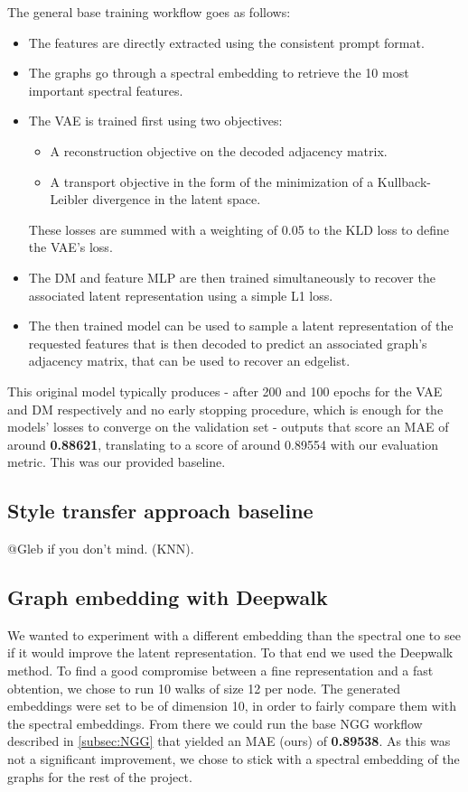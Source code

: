 \documentclass[10pt,twocolumn,letterpaper]{article}
\begin{document}
The general base training workflow goes as follows:
\begin{itemize}
    \item The features are directly extracted using the consistent prompt format.
    \item The graphs go through a spectral embedding to retrieve the 10 most important spectral features.
    \item The VAE is trained first using two objectives:
    \begin{itemize}
        \item A reconstruction objective on the decoded adjacency matrix.
        \item A transport objective in the form of the minimization of a Kullback-Leibler divergence in the latent space.
    \end{itemize}
    These losses are summed with a weighting of 0.05 to the KLD loss to define the VAE's loss.
    \item The DM and feature MLP are then trained simultaneously to recover the associated latent representation using a simple L1 loss.
    \item The then trained model can be used to sample a latent representation of the requested features that is then decoded to predict an associated graph's adjacency matrix, that can be used to recover an edgelist.
    
\end{itemize}
This original model typically produces  - after 200 and 100 epochs for the VAE and DM respectively and no early stopping procedure, which is enough for the models' losses to converge on the validation set - outputs that score an MAE of around \textbf{0.88621}, translating to a score of around \textbf{}{0.89554} with our evaluation metric. This was our provided baseline.

\subsection{Style transfer approach baseline}
\label{subsec:KNN}
@Gleb if you don't mind. (KNN).

\subsection{Graph embedding with Deepwalk}
\label{subsec:deepwalk}
We wanted to experiment with a different embedding than the spectral one to see if it would improve the latent representation. To that end we used the Deepwalk \cite{deepwalk} method. To find a good compromise between a fine representation and a fast obtention, we chose to run 10 walks of size 12 per node. The generated embeddings were set to be of dimension 10, in order to fairly compare them with the spectral embeddings. From there we could run the base NGG workflow described in \ref{subsec:NGG} that yielded an MAE (ours) of \textbf{0.89538}. As this was not a significant improvement, we chose to stick with a spectral embedding of the graphs for the rest of the project.
\end{document}
